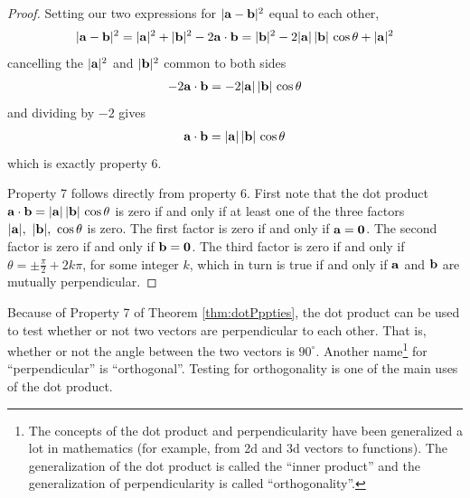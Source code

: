 \begin{proof}
Setting our two expressions for $|\mathbf{a}-\mathbf{b}|^2$ equal to each other,
\begin{align*}
|\mathbf{a}-\mathbf{b}|^2=|\mathbf{a}|^2+|\mathbf{b}|^2-2\mathbf{a}\cdot\mathbf{b}
=|\mathbf{b}|^2-2|\mathbf{a}|\,|\mathbf{b}|\,\cos\theta+|\mathbf{a}|^2
\end{align*}
cancelling the $|\mathbf{a}|^2$ and $|\mathbf{b}|^2$ common to both sides
\begin{align*}
-2\mathbf{a}\cdot\mathbf{b}
=-2|\mathbf{a}|\,|\mathbf{b}|\,\cos\theta
\end{align*}
and dividing by $-2$ gives 
\begin{align*}
\mathbf{a}\cdot\mathbf{b}=|\mathbf{a}|\,|\mathbf{b}|\,\cos\theta
\end{align*}
which is exactly property 6. 


Property 7 follows directly from property 6. First note that the dot product $\mathbf{a}\cdot\mathbf{b}=|\mathbf{a}|\,|\mathbf{b}|\,\cos\theta$
is zero if and only if at least one of the three factors 
$|\mathbf{a}|,\ |\mathbf{b}|,\ \cos\theta$ is zero. The first factor is zero if
and only if $\mathbf{a}=\mathbf{0} $. The second factor is zero if and only if 
$\mathbf{b}=\mathbf{0} $.
The third factor is zero if and only if $\theta=\pm\tfrac{\pi}{2}+2k\pi$,
for some integer $k$, which in turn is true if and only if $\mathbf{a}$ and 
$\mathbf{b}$ are mutually perpendicular.
\end{proof}
Because of Property 7 of Theorem \ref{thm:dotPppties}, the dot product 
can be used to test whether or not two vectors are perpendicular to 
each other. That is, whether or not the angle between the two vectors 
is $90^\circ$. Another name\footnote{The concepts of the dot product
and perpendicularity have been generalized a lot in mathematics (for example,
from 2d and 3d vectors to functions). The generalization of the dot 
product is called the ``inner product'' and the generalization 
of perpendicularity is called ``orthogonality''.} for ``perpendicular'' 
is ``orthogonal''. Testing for orthogonality is one of the main uses of the
dot product. 

